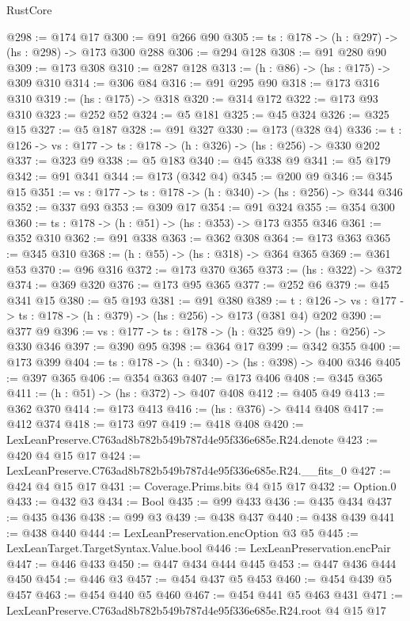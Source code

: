 \begin{lexlean}{RustCore}
\begin{coremodule}
@298 := @174 @17
@300 := @91 @266 @90
@305 := {ts : @178} -> (h : @297) -> (hs : @298) -> @173 @300 @288
@306 := @294 @128
@308 := @91 @280 @90
@309 := @173 @308
@310 := @287 @128
@313 := (h : @86) -> (hs : @175) -> @309 @310
@314 := @306 @84
@316 := @91 @295 @90
@318 := @173 @316 @310
@319 := (hs : @175) -> @318
@320 := @314 @172
@322 := @173 @93 @310
@323 := @252 @52
@324 := @5 @181
@325 := @45 @324
@326 := @325 @15
@327 := @5 @187
@328 := @91 @327
@330 := @173 (@328 @4)
@336 := {t : @126} -> {vs : @177} -> {ts : @178} -> (h : @326) -> (hs : @256) -> @330 @202
@337 := @323 @9
@338 := @5 @183
@340 := @45 @338 @9
@341 := @5 @179
@342 := @91 @341
@344 := @173 (@342 @4)
@345 := @200 @9
@346 := @345 @15
@351 := {vs : @177} -> {ts : @178} -> (h : @340) -> (hs : @256) -> @344 @346
@352 := @337 @93
@353 := @309 @17
@354 := @91 @324
@355 := @354 @300
@360 := {ts : @178} -> (h : @51) -> (hs : @353) -> @173 @355 @346
@361 := @352 @310
@362 := @91 @338
@363 := @362 @308
@364 := @173 @363
@365 := @345 @310
@368 := (h : @55) -> (hs : @318) -> @364 @365
@369 := @361 @53
@370 := @96 @316
@372 := @173 @370 @365
@373 := (hs : @322) -> @372
@374 := @369 @320
@376 := @173 @95 @365
@377 := @252 @6
@379 := @45 @341 @15
@380 := @5 @193
@381 := @91 @380
@389 := {t : @126} -> {vs : @177} -> {ts : @178} -> (h : @379) -> (hs : @256) -> @173 (@381 @4) @202
@390 := @377 @9
@396 := {vs : @177} -> {ts : @178} -> (h : @325 @9) -> (hs : @256) -> @330 @346
@397 := @390 @95
@398 := @364 @17
@399 := @342 @355
@400 := @173 @399
@404 := {ts : @178} -> (h : @340) -> (hs : @398) -> @400 @346
@405 := @397 @365
@406 := @354 @363
@407 := @173 @406
@408 := @345 @365
@411 := (h : @51) -> (hs : @372) -> @407 @408
@412 := @405 @49
@413 := @362 @370
@414 := @173 @413
@416 := (hs : @376) -> @414 @408
@417 := @412 @374
@418 := @173 @97
@419 := @418 @408
@420 := LexLeanPreserve.C763ad8b782b549b787d4e95f336e685e.R24.denote
@423 := @420 @4 @15 @17
@424 := LexLeanPreserve.C763ad8b782b549b787d4e95f336e685e.R24.__fits_0
@427 := @424 @4 @15 @17
@431 := Coverage.Prims.bits @4 @15 @17
@432 := Option.{0}
@433 := @432 @3
@434 := Bool
@435 := @99 @433
@436 := @435 @434
@437 := @435 @436
@438 := @99 @3
@439 := @438 @437
@440 := @438 @439
@441 := @438 @440
@444 := LexLeanPreservation.encOption @3 @5
@445 := LexLeanTarget.TargetSyntax.Value.bool
@446 := LexLeanPreservation.encPair
@447 := @446 @433
@450 := @447 @434 @444 @445
@453 := @447 @436 @444 @450
@454 := @446 @3
@457 := @454 @437 @5 @453
@460 := @454 @439 @5 @457
@463 := @454 @440 @5 @460
@467 := @454 @441 @5 @463 @431
@471 := LexLeanPreserve.C763ad8b782b549b787d4e95f336e685e.R24.root @4 @15 @17

\end{coremodule}
\end{lexlean}
